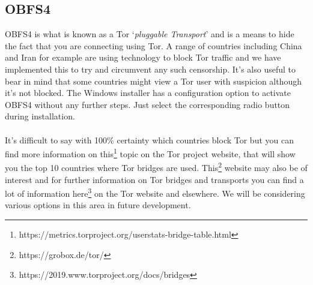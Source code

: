 \subsection{OBFS4}
OBFS4 is what is known as a Tor ‘\textit{pluggable Transport}’ and is a
means to hide the fact that you are connecting using Tor. A range of
countries including China and Iran for example are using technology to
block Tor traffic and we have implemented this to try and circumvent any
such censorship. It’s also useful to bear in mind that some countries might
view a Tor user with suspicion although it’s not blocked. The Windows installer
has a configuration option to activate OBFS4 without any further steps. Just
select the corresponding radio button during installation.
\\
\\
\noindent
It’s difficult to say with 100\% certainty which countries block Tor but
you can find more information on 
this\footnote{https://metrics.torproject.org/userstats-bridge-table.html}
topic on the Tor project website, that will show you the top 10 countries
where Tor bridges are used. This\footnote{https://grobox.de/tor/} website
may also be of interest and for further information on Tor bridges and
transports you can find a lot of information
here\footnote{https://2019.www.torproject.org/docs/bridges} on the Tor
website and elsewhere. We will be considering various options in this
area in future development.

